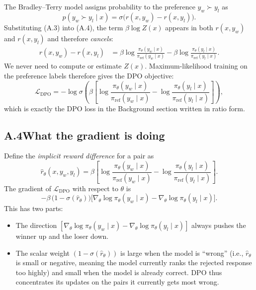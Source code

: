 \documentclass[11pt]{article}
\begin{document}
The Bradley--Terry model assigns probability to the preference \(y_w \succ y_l\) as
\begin{equation*}\tag{A.4}
p(y_w \succ y_l \mid x)
= \sigma\!\bigl(r(x, y_w) - r(x, y_l)\bigr).
\end{equation*}
Substituting (A.3) into (A.4), the term \(\beta \log Z(x)\) appears in both \(r(x, y_w)\) and \(r(x, y_l)\) and therefore \emph{cancels}:
\begin{align*}\tag{A.5}
r(x, y_w) - r(x, y_l)
&= \beta\log\frac{\pi_\theta(y_w\mid x)}{\pi_{\mathrm{ref}}(y_w\mid x)}
  - \beta\log\frac{\pi_\theta(y_l\mid x)}{\pi_{\mathrm{ref}}(y_l\mid x)}.
\end{align*}
We never need to compute or estimate \(Z(x)\).  Maximum-likelihood training on the preference labels therefore gives the DPO objective:
\begin{equation*}\tag{A.6}
\mathcal{L}_{\mathrm{DPO}}
= -\log\sigma\!\left(
    \beta\!\left[
      \log\frac{\pi_\theta(y_w\mid x)}{\pi_{\mathrm{ref}}(y_w\mid x)}
      -
      \log\frac{\pi_\theta(y_l\mid x)}{\pi_{\mathrm{ref}}(y_l\mid x)}
    \right]
  \right),
\end{equation*}
which is exactly the DPO loss in the Background section written in ratio form.

\subsection*{A.4\quad What the gradient is doing}

Define the \emph{implicit reward difference} for a pair as
\[
\hat{r}_\theta(x, y_w, y_l)
=
\beta\!\left[
  \log\frac{\pi_\theta(y_w\mid x)}{\pi_{\mathrm{ref}}(y_w\mid x)}
  -
  \log\frac{\pi_\theta(y_l\mid x)}{\pi_{\mathrm{ref}}(y_l\mid x)}
\right].
\]
The gradient of \(\mathcal{L}_{\mathrm{DPO}}\) with respect to \(\theta\) is
\begin{equation*}\tag{A.7}
-\beta\,
\bigl(1 - \sigma(\hat{r}_\theta)\bigr)
\bigl[
  \nabla_\theta \log\pi_\theta(y_w\mid x)
  -
  \nabla_\theta \log\pi_\theta(y_l\mid x)
\bigr].
\end{equation*}
This has two parts:
\begin{itemize}[itemsep=0.3em]
  \item The direction \([\nabla_\theta \log\pi_\theta(y_w\mid x) - \nabla_\theta \log\pi_\theta(y_l\mid x)]\) always pushes the winner up and the loser down.
  \item The scalar weight \((1 - \sigma(\hat{r}_\theta))\) is large when the model is ``wrong'' (i.e., \(\hat{r}_\theta\) is small or negative, meaning the model currently ranks the rejected response too highly) and small when the model is already correct.  DPO thus concentrates its updates on the pairs it currently gets most wrong.
\end{itemize}
\end{document}
